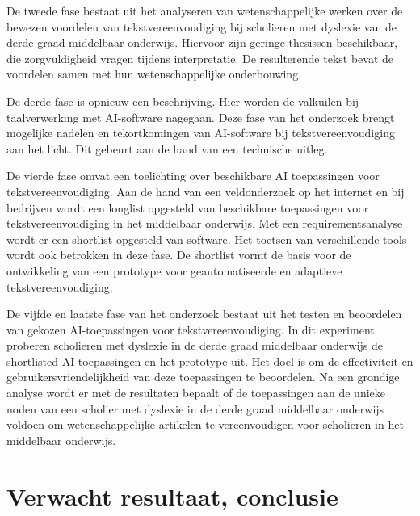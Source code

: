 De tweede fase bestaat uit het analyseren van wetenschappelijke werken over de bewezen voordelen van tekstvereenvoudiging bij scholieren met dyslexie van de derde graad middelbaar onderwijs. Hiervoor zijn geringe thesissen beschikbaar, die zorgvuldigheid vragen tijdens interpretatie. De resulterende tekst bevat de voordelen samen met hun wetenschappelijke onderbouwing.

De derde fase is opnieuw een beschrijving. Hier worden de valkuilen bij taalverwerking met AI-software nagegaan. Deze fase van het onderzoek brengt mogelijke nadelen en tekortkomingen van AI-software bij tekstvereenvoudiging aan het licht. Dit gebeurt aan de hand van een technische uitleg.

De vierde fase omvat een toelichting over beschikbare AI toepassingen voor tekstvereenvoudiging. Aan de hand van een veldonderzoek op het internet en bij bedrijven wordt een longlist opgesteld van beschikbare toepassingen voor tekstvereenvoudiging in het middelbaar onderwijs. Met een requirementsanalyse wordt er een shortlist opgesteld van software. Het toetsen van verschillende tools wordt ook betrokken in deze fase. De shortlist vormt de basis voor de ontwikkeling van een prototype voor geautomatiseerde en adaptieve tekstvereenvoudiging.



De vijfde en laatste fase van het onderzoek bestaat uit het testen en beoordelen van gekozen AI-toepassingen voor tekstvereenvoudiging. In dit experiment proberen scholieren met dyslexie in de derde graad middelbaar onderwijs de shortlisted AI toepassingen en het prototype uit. Het doel is om de effectiviteit en gebruikersvriendelijkheid van deze toepassingen te beoordelen. Na een grondige analyse wordt er met de resultaten bepaalt of de toepassingen aan de unieke noden van een scholier met dyslexie in de derde graad middelbaar onderwijs voldoen om wetenschappelijke artikelen te vereenvoudigen voor scholieren in het middelbaar onderwijs.

\section{Verwacht resultaat, conclusie}
\label{sec:verwachte_resultaten}

